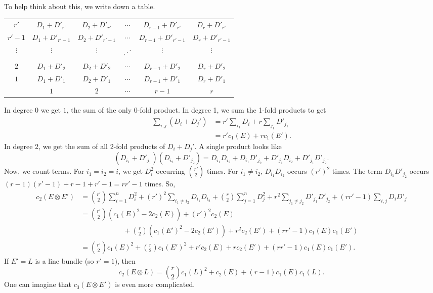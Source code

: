 \documentclass[12pt]{article}
\newcommand{\rddots}{\text{\reflectbox{$\ddots$}}}
\begin{document}
\begin{eg}
    To help think about this, we write down a table.
    \begin{center}
    \begin{tabular}{c|c c c c c}
        $r'$   & $D_1 + D'_{r'}$ & $D_2 +D'_{r'}$ & $\cdots$ & $D_{r-1} +D'_{r'}$ & $D_r + D'_{r'}$ \\
        $r'-1$ & $D_1 + D'_{r'-1}$ & $D_2 +D'_{r'-1}$ & $\cdots$ & $D_{r-1} +D'_{r'-1}$ & $D_r + D'_{r'-1}$ \\
        $\vdots$ & $\vdots$ & $\vdots$ & $\rddots$ & $\vdots$ & $\vdots$ \\
        $2$ & $D_1 + D'_2$ & $D_2 +D'_2$ & $\cdots$ & $D_{r-1} +D'_2$ & $D_r + D'_2$\\
        $1$ & $D_1 + D'_1$ & $D_2 + D'_1$ & $\cdots$ & $D_{r-1} + D'_1$ & $D_r + D'_1$\\\hline
            & $1$ & $2$ & $\cdots$ & $r-1$ & $r$
    \end{tabular}
    \end{center}
    In degree 0 we get $1$, the sum of the only 0-fold product. In degree 1, we sum the 1-fold products to get
    \begin{align*}
        \sum_{i,j}(D_i + D_j') &= r'\sum_{i_1} D_i + r\sum_{j_1} D'_{j_1}\\
        &= r'c_1(E) + rc_1(E').
    \end{align*}
    In degree 2, we get the sum of all 2-fold products of $D_i + D_j'$. A single product looks like
    \[(D_{i_1} + D'_{j_1})(D_{i_2} + D'_{j_2}) = D_{i_1}D_{i_2} + D_{i_1}D'_{j_2} + D'_{j_1}D_{i_2} + D'_{j_1}D'_{j_2}.\]
    Now, we count terms. For $i_1=i_2=i$, we get $D_i^2$ occurring $\binom{r'}{2}$ times. For $i_1\neq i_2$, $D_{i_1}D_{i_2}$ occurs $(r')^2$ times. The term $D_{i_1}D'_{j_2}$ occurs $(r-1)(r'-1) + r-1 + r'-1 = rr'-1$ times. So,
    \begin{align*}
        c_2(E\otimes E') &= \binom{r'}{2} \sum_{i=1}^n D_i^2 + (r')^2\sum_{i_1\neq i_2} D_{i_1} D_{i_2} + \binom{r}{2} \sum_{j=1}^n D_j^2 + r^2 \sum_{j_1 \neq j_2} D'_{j_1}D'_{j_2} + (rr'-1)\sum_{i,j} D_iD'_j\\
        &= \binom{r'}{2}(c_1(E)^2-2c_2(E)) + (r')^2 c_2(E)\\
        &\qquad\qquad\qquad + \binom{r}{2}(c_1(E')^2-2c_2(E')) + r^2 c_2(E') + (rr'-1) c_1(E)c_1(E')\\
        &= \binom{r'}{2} c_1(E)^2 + \binom{r}{2} c_1(E')^2 + r'c_2(E) + rc_2(E') + (rr'-1)c_1(E)c_1(E').
    \end{align*}
    If $E'=L$ is a line bundle (so $r'=1$), then
    \[c_2(E\otimes L) = \binom{r}{2}c_1(L)^2 + c_2(E) + (r-1)c_1(E)c_1(L).\]
    One can imagine that $c_3(E\otimes E')$ is even more complicated.
\end{eg}
\end{document}
